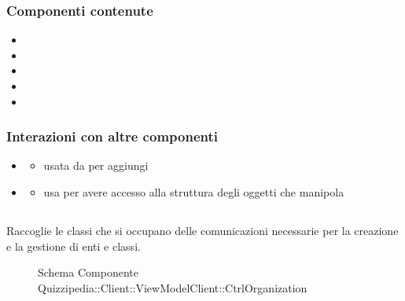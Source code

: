 \subsubsection{Componenti contenute}
\begin{itemize}
\item {}
\item {}
\item {}
\item {}
\item {}
\end{itemize}
\subsubsection{Interazioni con altre componenti}
\begin{itemize}
\item {}
\begin{itemize}
\item usata da  per aggiungi
\end{itemize}
\item {}
\begin{itemize}
\item usa  per avere accesso alla struttura degli oggetti che manipola
\end{itemize}
\end{itemize}
\subsection{}
Raccoglie le classi che si occupano delle comunicazioni necessarie per la creazione e la gestione di enti e classi.
\begin{figure}[H]
\centering
\noindent{}
\caption[Schema Componente Quizzipedia::Client::ViewModelClient::CtrlOrganization]{Schema Componente Quizzipedia::Client::ViewModelClient::CtrlOrganization}
\end{figure}
